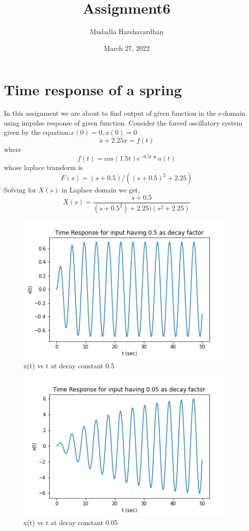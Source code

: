 \documentclass[11pt, a4paper]{article}
\title{Assignment6}
\author{Mudadla Harshavardhan}
\date{March 27, 2022}
\begin{document}
\maketitle %
\section{Time response of a spring}
In this assignment we are about to find output of given function in the s-domain using impulse response of given function.
Consider the forced oscillatory system given by the equation:$x(0)=0,\dot x(0)=0$
\begin{equation}
    \ddot x + 2.25x = f(t)
\end{equation}
where
\begin{equation}
    f(t) = cos(1.5t)e^{-0.5t}*u(t)
\end{equation}
whose laplace transform is
\begin{equation}
    F(s) = (s+0.5)/((s+0.5)^2+2.25)
\end{equation}
Solving for $X(s)$ in Laplace domain we get,
\begin{equation}
    X(s) = \frac{s+0.5}{(s+0.5^2)+2.25)(s^2+2.25)}
\end{equation}
\begin{figure}[!tbh]
  \centering
  \includegraphics[scale=0.5]{0.5decay.png}
  \caption{x(t) vs t at decay constant 0.5} 
  \label{fig:fig1}
\end{figure} 

\begin{figure}[!tbh]
  \centering
  \includegraphics[scale=0.5]{0.05decay.png}  
  \caption{x(t) vs t at decay constant 0.05} 
  \label{fig:fig2}
\end{figure} 
\pagebreak
\newpage
\end{document}
